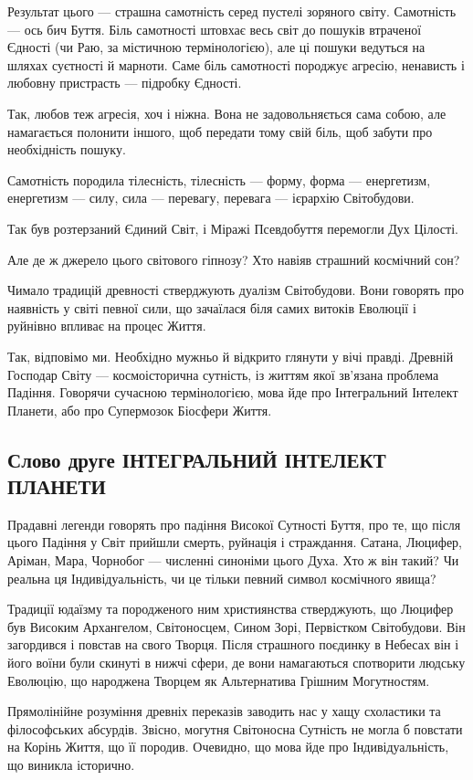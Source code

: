 Результат цього — страшна самотність серед пустелі зоряного світу. Самотність —
ось бич Буття. Біль самотності штовхає весь світ до пошуків втраченої Єдності
(чи Раю, за містичною термінологією), але ці пошуки ведуться на шляхах
суєтності й марноти. Саме біль самотності породжує агресію, ненависть і любовну
пристрасть — підробку Єдності.

Так, любов теж агресія, хоч і ніжна. Вона не задовольняється сама собою, але
намагається полонити іншого, щоб передати тому свій біль, щоб забути про
необхідність пошуку.

Самотність породила тілесність, тілесність — форму, форма — енергетизм,
енергетизм — силу, сила — перевагу, перевага — ієрархію Світобудови.

Так був розтерзаний Єдиний Світ, і Міражі Псевдобуття перемогли Дух Цілості.

Але де ж джерело цього світового гіпнозу? Хто навіяв страшний космічний сон?

Чимало традицій древності стверджують дуалізм Світобудови. Вони говорять про
наявність у світі певної сили, що зачаїлася біля самих витоків Еволюції і
руйнівно впливає на процес Життя.

Так, відповімо ми. Необхідно мужньо й відкрито глянути у вічі правді. Древній
Господар Світу — космоісторична сутність, із життям якої зв’язана проблема
Падіння. Говорячи сучасною термінологією, мова йде про Інтегральний Інтелект
Планети, або про Супермозок Біосфери Життя.

\subsection{Слово друге ІНТЕГРАЛЬНИЙ ІНТЕЛЕКТ ПЛАНЕТИ}

Прадавні легенди говорять про падіння Високої Сутності Буття, про те, що після
цього Падіння у Світ прийшли смерть, руйнація і страждання. Сатана, Люцифер,
Аріман, Мара, Чорнобог — численні синоніми цього Духа. Хто ж він такий? Чи
реальна ця Індивідуальність, чи це тільки певний символ космічного явища?

Традиції юдаїзму та породженого ним християнства стверджують, що Люцифер був
Високим Архангелом, Світоносцем, Сином Зорі, Первістком Світобудови. Він
загордився і повстав на свого Творця. Після страшного поєдинку в Небесах він і
його воїни були скинуті в нижчі сфери, де вони намагаються спотворити людську
Еволюцію, що народжена Творцем як Альтернатива Грішним Могутностям.

Прямолінійне розуміння древніх переказів заводить нас у хащу схоластики та
філософських абсурдів. Звісно, могутня Світоносна Сутність не могла б повстати
на Корінь Життя, що її породив. Очевидно, що мова йде про Індивідуальність, що
виникла історично.

